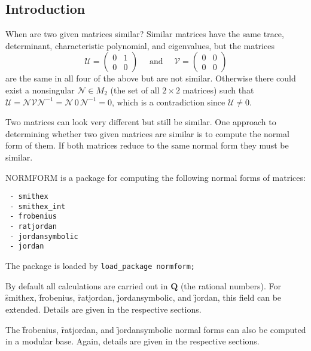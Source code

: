 
\newcommand{\rank}{\mathop{\mathrm{rank}}}

\subsection{Introduction}
When are two given matrices similar? Similar matrices have the same
trace, determinant, characteristic polynomial, 
and eigenvalues, but the matrices 
\begin{displaymath}
 \mathcal{U} = \begin{pmatrix} 0 & 1 \\ 0 & 0 \end{pmatrix} 
  \quad\text{ and } \quad
 \mathcal{V} = \begin{pmatrix} 0 & 0 \\ 0 & 0 \end{pmatrix}
\end{displaymath}
are the same in all four of the above but are not similar. Otherwise 
there could exist a nonsingular $\mathcal{ N} {\in} M_{2}$ (the set of 
all $2 \times 2$ matrices) such that $\mathcal{U} = \mathcal{N} \mathcal{V}
\mathcal{N}^{-1} = \mathcal{N} \, \mathit{0} \, \mathcal{N}^{-1} = \mathit{0}$, 
which is a contradiction since $\mathcal{U} \neq \mathit{0}$.

Two matrices can look very different but still be similar. One 
approach to determining whether two given matrices are similar is to 
compute the normal form of them. If both matrices reduce to the same 
normal form they must be similar.

{\small NORMFORM} is a package for computing the following normal 
forms of matrices:

\begin{verbatim}
 - smithex
 - smithex_int
 - frobenius
 - ratjordan
 - jordansymbolic
 - jordan
\end{verbatim}
 
The package is loaded by \texttt{load\_package normform;}

By default all calculations are carried out in $\mathbf{Q}$ (the rational 
numbers). For \f{smithex}, \f{frobenius}, \f{ratjordan}, 
\f{jordansymbolic}, and \f{jordan}, this field can be extended. 
Details are given in the respective sections.

The \f{frobenius}, \f{ratjordan}, and \f{jordansymbolic} normal 
forms can also be computed in a modular base. Again, details are given 
in the respective sections.

